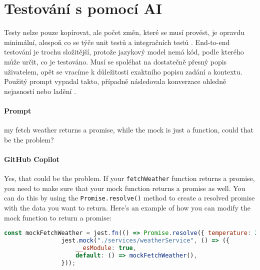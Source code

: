 \documentclass[FM,DP]{tulthesis}
\begin{document}
		\section{Testování s pomocí AI}
		
		Testy nelze pouze kopírovat, ale počet změn, které se musí provést, je opravdu minimální, alespoň co se týče unit testů a integračních testů \cite{testing}. End-to-end testování je trochu složitější, protože jazykový model nemá kód, podle kterého může určit, co je testováno. Musí se spoléhat na dostatečně přesný popis uživatelem, opět se vracíme k důležitosti exaktního popisu zadání a kontextu. Použitý prompt vypadal takto, případně následovala konverzace ohledně nejasností nebo ladění \cite{testing}.
		
		\vspace{0.6em}
		\begin{tcolorbox}[colback=white,colframe=black,title=Konverzace s opakovaním kódu]
			\paragraph{Prompt}
			my fetch weather returns a promise, while the mock is just a function, could that be the problem?
			
			\vspace{0.6em}
			
			\paragraph{GitHub Copilot}
			Yes, that could be the problem. If your \verb|fetchWeather| function returns a promise, you need to make sure that your mock function returns a promise as well. You can do this by using the \verb|Promise.resolve()| method to create a resolved promise with the data you want to return. Here's an example of how you can modify the mock function to return a promise:
			
			\vspace{0.6em}
			
			\begin{lstlisting}[language=JavaScript]
				const mockFetchWeather = jest.fn(() => Promise.resolve({ temperature: 20 }));
				jest.mock("./services/weatherService", () => ({
					__esModule: true,
					default: () => mockFetchWeather(),
				}));
			\end{lstlisting}
			
			\vspace{0.6em}
			
			

\end{tcolorbox}
\end{document}
